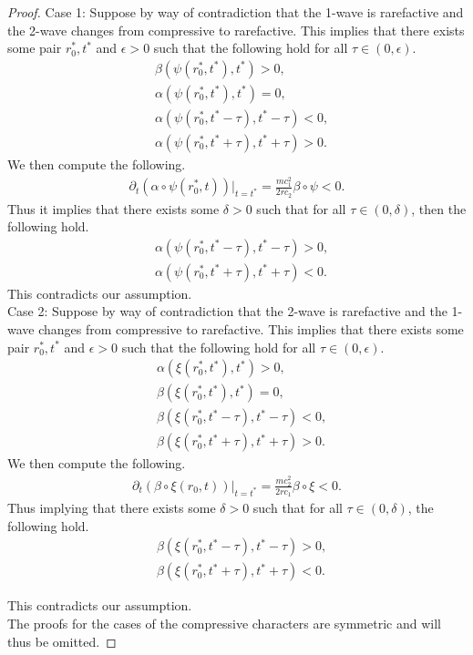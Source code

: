 \documentclass[11pt]{article}
\begin{document}
\begin{proof}
Case 1: Suppose by way of contradiction that the 1-wave is rarefactive and the 2-wave changes from compressive to rarefactive. This implies that there exists some pair $r_0^*,t^*$ and $\epsilon>0$ such that the following hold for all $\tau \in (0,\epsilon)$. 
\begin{align}
	&\beta(\psi(r_0^*,t^*),t^*) > 0, 
	\\
	&\alpha(\psi(r_0^*,t^*),t^*)=0, 
	\\
	&\alpha(\psi(r_0^*,t^*-\tau),t^*-\tau) < 0, 
	\\
	&\alpha(\psi(r_0^*,t^*+\tau),t^*+\tau) > 0. 
\end{align} 
We then compute the following. 
\begin{align}
	\partial_t(\alpha\circ\psi(r_0^*,t))|_{t=t^*} = \frac{mc_1^2}{2rc_2}\beta\circ\psi < 0. 
\end{align} 
Thus it implies that there exists some $\delta>0$ such that for all $\tau\in(0,\delta)$, then the following hold. 
\begin{align}
	&\alpha(\psi(r_0^*,t^*-\tau),t^*-\tau) > 0, 
	\\
	&\alpha(\psi(r_0^*,t^*+\tau),t^*+\tau) < 0. 
\end{align} 
This contradicts our assumption. 
\bigskip
\\
Case 2: Suppose by way of contradiction that the 2-wave is rarefactive and the 1-wave changes from compressive to rarefactive. This implies that there exists some pair $r_0^*,t^*$ and $\epsilon>0$ such that the following hold for all $\tau \in (0,\epsilon)$. 
\begin{align}
	&\alpha(\xi(r_0^*,t^*),t^*) > 0, 
	\\
	&\beta(\xi(r_0^*,t^*),t^*)=0, 
	\\
	&\beta(\xi(r_0^*,t^*-\tau),t^*-\tau) < 0, 
	\\
	&\beta(\xi(r_0^*,t^*+\tau),t^*+\tau) > 0. 
\end{align} 
We then compute the following. 
\begin{align}
	\partial_t(\beta\circ\xi(r_0,t))|_{t=t^*} = \frac{mc_2^2}{2rc_1}\beta\circ\xi < 0. 
\end{align} 
Thus implying that there exists some $\delta>0$ such that for all $\tau\in(0,\delta)$, the following hold. 
\begin{align}
	&\beta(\xi(r_0^*,t^*-\tau),t^*-\tau) > 0, 
	\\
	&\beta(\xi(r_0^*,t^*+\tau),t^*+\tau) < 0. 
\end{align} 

This contradicts our assumption. 
\bigskip
\\
The proofs for the cases of the compressive characters are symmetric and will thus be omitted. 
	\end{proof} 
\end{document}
